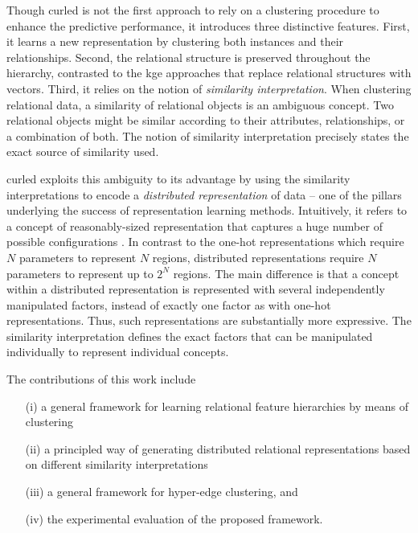 Though \gls{curled} is not the first approach to rely on a clustering procedure to enhance the predictive performance, it introduces three distinctive features.
First, it learns a new representation by clustering both instances and their relationships.
Second, the relational structure is  preserved throughout the hierarchy, contrasted to the \gls{kge} approaches that replace relational structures with vectors.
Third, it relies on the notion of \textit{similarity interpretation}.
When clustering relational data, a similarity of relational objects is an ambiguous concept.
Two relational objects might be similar according to their attributes, relationships, or a combination of both.
The notion of similarity interpretation precisely states the exact source of similarity used.



\gls{curled} exploits this ambiguity to its advantage by using the similarity interpretations to encode a \textit{distributed representation} of data -- one of the pillars underlying the success of representation learning methods.
Intuitively, it refers to a concept of  reasonably-sized representation that captures a huge number of possible configurations \cite{Bengio2013RLR}.
In contrast to the one-hot representations which require $N$ parameters to represent $N$ regions,  distributed representations require $N$ parameters to represent up to $2^N$ regions.
The main difference is that a concept within a distributed representation is represented with several independently manipulated factors, instead of exactly one factor as with one-hot representations.
Thus, such representations are substantially more expressive.
The similarity interpretation defines the exact factors that can be manipulated individually to represent individual concepts.



The contributions of this work include
\begin{itemize}
	\item[(i)] a general framework for learning relational feature hierarchies by means of clustering
	\item[(ii)] a principled way of generating distributed relational representations based on different similarity interpretations
	\item[(iii)] a general framework for hyper-edge clustering, and
	\item[(iv)] the experimental evaluation of the proposed framework.
\end{itemize}



